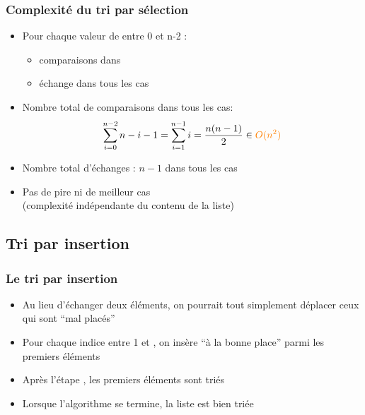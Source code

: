 \documentclass[12pt]{linfo-beamer}
\begin{document}
\begin{frame}
  \frametitle{Complexité du tri par sélection}

  \begin{itemize}
  \item Pour chaque valeur de  entre 0 et n-2 :
    \begin{itemize}
    \item {} comparaisons dans 
    \item  {} échange dans tous les cas
    \end{itemize}
  \item Nombre total de comparaisons dans tous les cas:
    \[
    \sum_{i=0}^{n-2} n-i-1 = \sum_{i=1}^{n-1} i = \frac{n(n-1)}{2} \in {\color{orange} O(n^2)}
    \]
  \item Nombre total d'échanges : $n-1$ dans tous les cas

  \item Pas de pire ni de meilleur cas\\(complexité indépendante du
    contenu de la liste)
  \end{itemize}
\end{frame}


\subsection{Tri par insertion}
\label{sub:tri_par_insertion}

\begin{frame}
  \frametitle{Le tri par insertion}

  \begin{itemize}

  \item Au lieu d'échanger deux éléments, on pourrait tout simplement
    déplacer ceux qui sont ``mal placés''

    \medskip

  \item Pour chaque indice  entre 1 et , on
    insère  ``à la bonne place'' parmi les 
    premiers éléments

    \medskip

  \item Après l'étape , les  premiers éléments sont triés
  \item Lorsque l'algorithme se termine, la liste est bien triée

  \end{itemize}
\end{frame}
\end{document}

